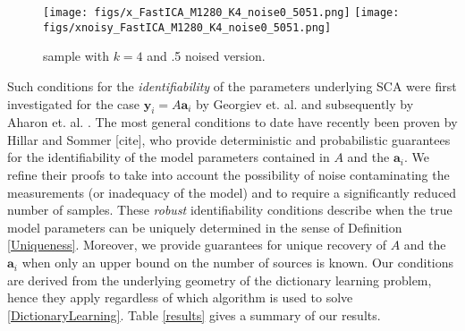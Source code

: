 \documentclass[journal, onecolumn]{IEEEtran}
\begin{document}
\begin{figure*}[t!]
\begin{center}
\texttt{[image: figs/x\_FastICA\_M1280\_K4\_noise0\_5051.png]}
\texttt{[image: figs/xnoisy\_FastICA\_M1280\_K4\_noise0\_5051.png]}
\caption{sample with $k=4$ and .5 noised version.}
\end{center}
\end{figure*}




%
%
%







Such conditions for the \emph{identifiability} of the parameters underlying SCA were first investigated for the case $\mathbf{y}_i = A\mathbf{a}_i$ by Georgiev et. al. \cite{Georgiev05} and subsequently by Aharon et. al. \cite{Aharon06}. The most general conditions to date have recently been proven by Hillar and Sommer [cite], who provide deterministic and probabilistic guarantees for the identifiability of the model parameters contained in $A$ and the $\mathbf{a}_i$. We refine their proofs to take into account the possibility of noise contaminating the measurements (or inadequacy of the model) and to require a significantly reduced number of samples. These \emph{robust} identifiability conditions describe when the true model parameters can be uniquely determined in the sense of Definition \ref{Uniqueness}. Moreover, we provide guarantees for unique recovery of $A$ and the $\mathbf{a}_i$ when only an upper bound on the number of sources is known. Our conditions are derived from the underlying geometry of the dictionary learning problem, hence they apply regardless of which algorithm is used to solve \eqref{DictionaryLearning}. Table \ref{results} gives a summary of our results.
\end{document}
